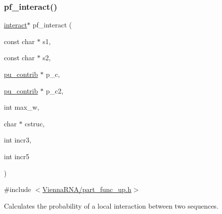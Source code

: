 \subsubsection{\texorpdfstring{pf\+\_\+interact()}{pf\_interact()}}
{\footnotesize\ttfamily \hyperlink{group__data__structures_structinteract}{interact}$\ast$ pf\+\_\+interact (\begin{DoxyParamCaption}\item[{const char $\ast$}]{s1,  }\item[{const char $\ast$}]{s2,  }\item[{\hyperlink{group__data__structures_structpu__contrib}{pu\+\_\+contrib} $\ast$}]{p\+\_\+c,  }\item[{\hyperlink{group__data__structures_structpu__contrib}{pu\+\_\+contrib} $\ast$}]{p\+\_\+c2,  }\item[{int}]{max\+\_\+w,  }\item[{char $\ast$}]{cstruc,  }\item[{int}]{incr3,  }\item[{int}]{incr5 }\end{DoxyParamCaption})}



{\ttfamily \#include $<$\hyperlink{part__func__up_8h}{Vienna\+R\+N\+A/part\+\_\+func\+\_\+up.\+h}$>$}



Calculates the probability of a local interaction between two sequences. 


